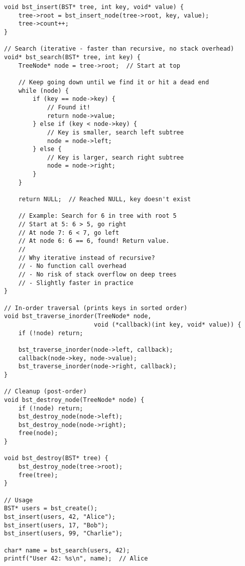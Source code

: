 \begin{lstlisting}
void bst_insert(BST* tree, int key, void* value) {
    tree->root = bst_insert_node(tree->root, key, value);
    tree->count++;
}

// Search (iterative - faster than recursive, no stack overhead)
void* bst_search(BST* tree, int key) {
    TreeNode* node = tree->root;  // Start at top

    // Keep going down until we find it or hit a dead end
    while (node) {
        if (key == node->key) {
            // Found it!
            return node->value;
        } else if (key < node->key) {
            // Key is smaller, search left subtree
            node = node->left;
        } else {
            // Key is larger, search right subtree
            node = node->right;
        }
    }

    return NULL;  // Reached NULL, key doesn't exist

    // Example: Search for 6 in tree with root 5
    // Start at 5: 6 > 5, go right
    // At node 7: 6 < 7, go left
    // At node 6: 6 == 6, found! Return value.
    //
    // Why iterative instead of recursive?
    // - No function call overhead
    // - No risk of stack overflow on deep trees
    // - Slightly faster in practice
}

// In-order traversal (prints keys in sorted order)
void bst_traverse_inorder(TreeNode* node,
                         void (*callback)(int key, void* value)) {
    if (!node) return;

    bst_traverse_inorder(node->left, callback);
    callback(node->key, node->value);
    bst_traverse_inorder(node->right, callback);
}

// Cleanup (post-order)
void bst_destroy_node(TreeNode* node) {
    if (!node) return;
    bst_destroy_node(node->left);
    bst_destroy_node(node->right);
    free(node);
}

void bst_destroy(BST* tree) {
    bst_destroy_node(tree->root);
    free(tree);
}

// Usage
BST* users = bst_create();
bst_insert(users, 42, "Alice");
bst_insert(users, 17, "Bob");
bst_insert(users, 99, "Charlie");

char* name = bst_search(users, 42);
printf("User 42: %s\n", name);  // Alice
\end{lstlisting}

